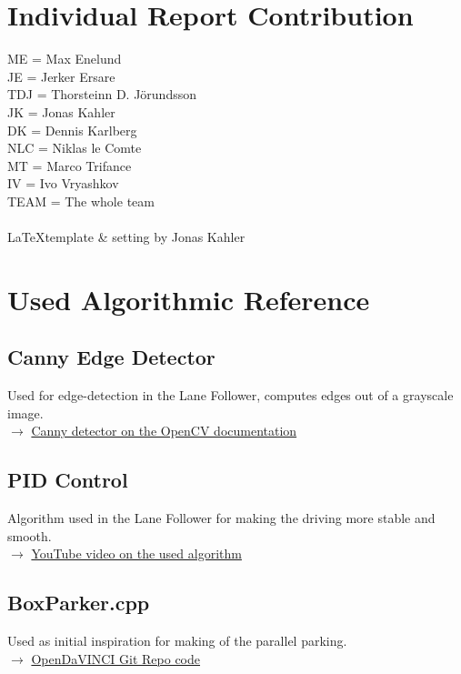 \label{appendix}
\appendix

\chapter{Individual Report Contribution}
ME = Max Enelund\\
JE = Jerker Ersare\\
TDJ = Thorsteinn D. J{\"o}rundsson\\
JK = Jonas Kahler\\
DK = Dennis Karlberg\\
NLC = Niklas le Comte\\
MT = Marco Trifance\\
IV = Ivo Vryashkov\\
TEAM = The whole team\\\\
\LaTeX template \& setting by Jonas Kahler

\chapter{Used Algorithmic Reference}
\section{Canny Edge Detector}
Used for edge-detection in the Lane Follower, computes edges out of a grayscale
image.\\
$\rightarrow$
\href{http://docs.opencv.org/2.4/doc/tutorials/imgproc/imgtrans/canny_detector/canny_detector.html}{Canny detector on the OpenCV documentation}

\section{PID Control}
Algorithm used in the Lane Follower for making the driving more stable and
smooth.\\
$\rightarrow$
\href{https://www.youtube.com/watch?v=4Y7zG48uHRo}
{YouTube video on the used algorithm}

\section{BoxParker.cpp}
Used as initial inspiration for making of the parallel parking.\\
$\rightarrow$
\href{https://github.com/se-research/OpenDaVINCI/blob/master/automotive/miniature/boxparker/src/BoxParker.cpp}
{OpenDaVINCI Git Repo code}
